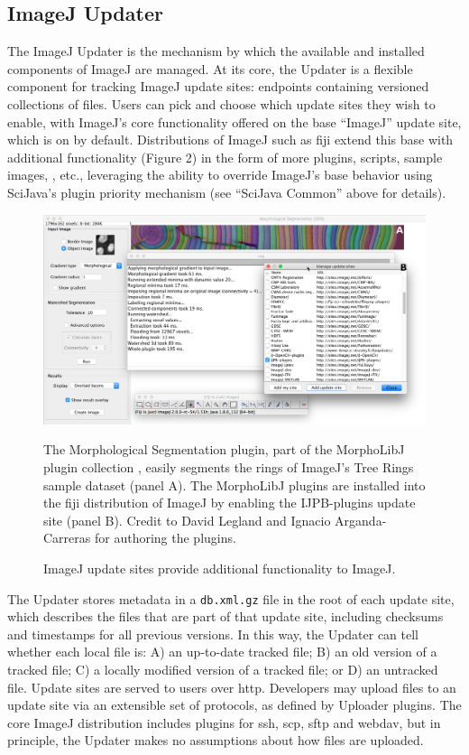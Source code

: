 \documentclass{bmcart}
\begin{document}
\subsection*{ImageJ Updater}
The ImageJ Updater is the mechanism by which the available and installed
components of ImageJ are managed. At its core, the Updater is a flexible
component for tracking ImageJ update sites: endpoints containing versioned
collections of files. Users can pick and choose which update sites they wish to
enable, with ImageJ's core functionality offered on the base ``ImageJ'' update
site, which is on by default. Distributions of ImageJ such as \acrfull{fiji}
\cite{fiji} extend this base with additional functionality (Figure 2) in the
form of more plugins, scripts, sample images, , etc., leveraging
the ability to override ImageJ's base behavior using SciJava's plugin priority
mechanism (see ``SciJava Common'' above for details).

  \begin{figure}[h]
    \caption{ImageJ update sites provide additional functionality to ImageJ.}
    \includegraphics[width=4.75in,natwidth=2515,natheight=1379]{figure-2/figure-labeled.png}
    \begin{flushleft}
      \footnotesize
      The Morphological Segmentation plugin, part of the MorphoLibJ plugin
      collection \cite{morpholibj}, easily segments the rings of ImageJ's Tree
      Rings sample dataset (panel A). The MorphoLibJ plugins are installed into
      the \acrshort{fiji} distribution of ImageJ by enabling the IJPB-plugins
      update site (panel B). Credit to David Legland and Ignacio
      Arganda-Carreras for authoring the plugins.
    \end{flushleft}
  \end{figure}

The Updater stores metadata in a \texttt{db.xml.gz} file in the root of each
update site, which describes the files that are part of that update site,
including checksums and timestamps for all previous versions. In this way, the
Updater can tell whether each local file is: A) an up-to-date tracked file; B)
an old version of a tracked file; C) a locally modified version of a tracked
file; or D) an untracked file. Update sites are served to users over
\acrfull{http}. Developers may upload files to an update site via an extensible
set of protocols, as defined by Uploader plugins. The core ImageJ distribution
includes plugins for \acrfull{ssh}, \acrfull{scp}, \acrfull{sftp} and
\acrfull{webdav}, but in principle, the Updater makes no assumptions about how
files are uploaded.
\end{document}
